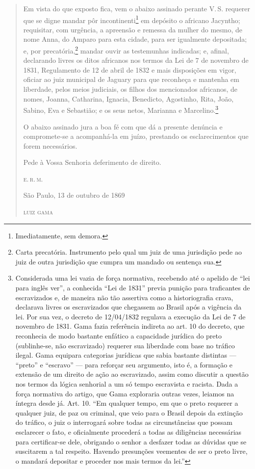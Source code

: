 \begin{quote}
Em vista do que exposto fica, vem o abaixo assinado perante V.\,S.
requerer que se digne mandar pôr incontinenti\footnote{Imediatamente,
  sem demora.} em depósito o africano Jacyntho; requisitar, com
urgência, a apreensão e remessa da mulher do mesmo, de nome Anna, do
Amparo para esta cidade, para ser igualmente depositada; e, por
precatória,\footnote{Carta precatória. Instrumento pelo qual um juiz de
  uma jurisdição pede ao juiz de outra jurisdição que cumpra um mandado
  ou sentença sua.} mandar ouvir as testemunhas indicadas; e, afinal,
declarando livres os ditos africanos nos termos da Lei de 7 de novembro
de 1831, Regulamento de 12 de abril de 1832 e mais disposições em vigor,
oficiar ao juiz municipal de Jaguary para que reconheça e mantenha em
liberdade, pelos meios judiciais, os filhos dos mencionados africanos,
de nomes, Joanna, Catharina, Ignacia, Benedicto, Agostinho, Rita, João,
Sabino, Eva e Sebastião; e os seus netos, Marianna e
Marcelino.\footnote{Considerada uma lei vazia de força normativa,
  recebendo até o apelido de ``lei para inglês ver'', a conhecida ``Lei de
  1831'' previa punição para traficantes de escravizados e, de maneira
  não tão assertiva como a historiografia crava, declarava livres os
  escravizados que chegassem ao Brasil após a vigência da lei. Por sua
  vez, o decreto de 12/04/1832 regulava a execução da Lei de 7 de
  novembro de 1831. Gama fazia referência indireta ao art. 10 do
  decreto, que reconhecia de modo bastante enfático a capacidade
  jurídica do preto (sublinhe-se, não escravizado) requerer sua
  liberdade com base no tráfico ilegal. Gama equipara categorias
  jurídicas que sabia bastante distintas --- ``preto'' e ``escravo'' --- para
  reforçar seu argumento, isto é, a formação e extensão de um direito de
  ação ao escravizado, assim como discutir a questão nos termos da
  lógica senhorial a um só tempo escravista e racista. Dada a força
  normativa do artigo, que Gama exploraria outras vezes, leiamos na
  íntegra desde já. Art. 10. ``Em qualquer tempo, em que o preto requerer
  a qualquer juiz, de paz ou criminal, que veio para o Brasil depois da
  extinção do tráfico, o juiz o interrogará sobre todas as
  circunstâncias que possam esclarecer o fato, e oficialmente procederá
  a todas as diligências necessárias para certificar-se dele, obrigando
  o senhor a desfazer todas as dúvidas que se suscitarem a tal respeito.
  Havendo presunções veementes de ser o preto livre, o mandará depositar
  e proceder nos mais termos da lei.''\label{ingles}}

O abaixo assinado jura a boa fé com que dá a presente denúncia e
compromete-se a acompanhá-la em juízo, prestando os esclarecimentos que
forem necessários.

\begin{flushright}
Pede à Vossa Senhoria deferimento de direito.

\textsc{e.\,r.\,m.}

São Paulo, 13 de outubro de 1869

\textsc{luiz gama}
\end{flushright}
\end{quote}

